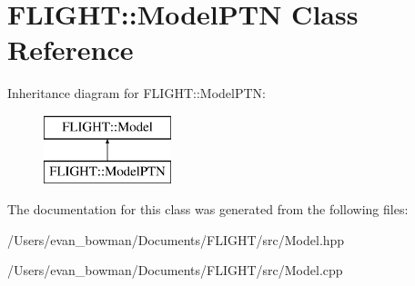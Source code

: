 \hypertarget{class_f_l_i_g_h_t_1_1_model_p_t_n}{}\section{F\+L\+I\+G\+HT\+:\+:Model\+P\+TN Class Reference}
\label{class_f_l_i_g_h_t_1_1_model_p_t_n}
Inheritance diagram for F\+L\+I\+G\+HT\+:\+:Model\+P\+TN\+:\begin{figure}[H]
\begin{center}
\leavevmode
\includegraphics[height=2.000000cm]{class_f_l_i_g_h_t_1_1_model_p_t_n}
\end{center}
\end{figure}


The documentation for this class was generated from the following files\+:\begin{DoxyCompactItemize}
\item 
/\+Users/evan\+\_\+bowman/\+Documents/\+F\+L\+I\+G\+H\+T/src/Model.\+hpp\item 
/\+Users/evan\+\_\+bowman/\+Documents/\+F\+L\+I\+G\+H\+T/src/Model.\+cpp\end{DoxyCompactItemize}

